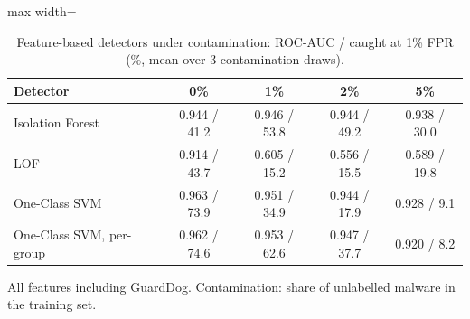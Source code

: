 \begin{table}[htbp]
\centering
\small
\caption{Feature-based detectors under contamination: ROC-AUC / caught at 1\% FPR (\%, mean over 3 contamination draws).}
\label{tab:baselines-contam}
\begin{adjustbox}{max width=\linewidth}
\begin{tabular}{lcccc}
\toprule
Detector & 0\% & 1\% & 2\% & 5\% \\
\midrule
Isolation Forest & 0.944 / 41.2 & 0.946 / 53.8 & 0.944 / 49.2 & 0.938 / 30.0 \\
LOF & 0.914 / 43.7 & 0.605 / 15.2 & 0.556 / 15.5 & 0.589 / 19.8 \\
One-Class SVM & 0.963 / 73.9 & 0.951 / 34.9 & 0.944 / 17.9 & 0.928 / 9.1 \\
One-Class SVM, per-group & 0.962 / 74.6 & 0.953 / 62.6 & 0.947 / 37.7 & 0.920 / 8.2 \\
\bottomrule
\end{tabular}
\end{adjustbox}
\par\smallskip
\parbox{0.95\linewidth}{\footnotesize All features including GuardDog. Contamination: share of unlabelled malware in the training set.}
\end{table}
